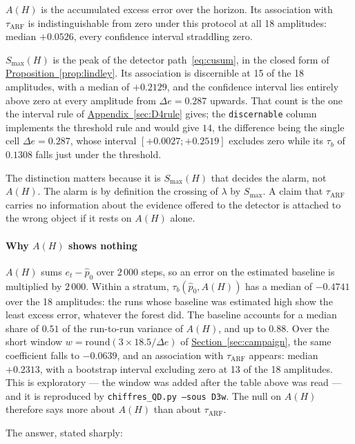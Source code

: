 \documentclass[10pt,conference]{IEEEtran}
\theoremstyle{definition}
\begin{document}
$A(H)$ is the accumulated excess error over the horizon. Its association with
$\tau_{\mathrm{ARF}}$ is indistinguishable from zero under this protocol at all
18 amplitudes: median $+0.0526$, every confidence interval straddling zero.

$S_{\max}(H)$ is the peak of the detector path~\eqref{eq:cusum}, in the closed form of
\hyperref[prop:lindley]{Proposition~\ref*{prop:lindley}}. Its association is discernible at 15 of the 18 amplitudes, with a median of $+0.2129$, and the
confidence interval lies entirely above zero at every amplitude from $\Delta e = 0.287$
upwards. That count is the one the interval rule of \hyperref[sec:D4rule]{Appendix~\ref*{sec:D4rule}} gives; the
\texttt{discernable} column implements the threshold rule and would give $14$, the
difference being the single cell $\Delta e = 0.287$, whose interval $[+0.0027 ; +0.2519]$
excludes zero while its $\tau_b$ of $0.1308$ falls just under the threshold.

The distinction matters because it is $S_{\max}(H)$ that decides the alarm, not $A(H)$.
The alarm is by definition the crossing of $\lambda$ by $S_{\max}$. A claim that
$\tau_{\mathrm{ARF}}$ carries no information about the evidence offered to the detector is
attached to the wrong object if it rests on $A(H)$ alone.

\paragraph{Why $A(H)$ shows nothing} $A(H)$ sums $e_t - \hat p_0$ over $2\,000$ steps, so an
error on the estimated baseline is multiplied by $2\,000$. Within a stratum,
$\tau_b(\hat p_0, A(H))$ has a median of $-0.4741$ over the 18 amplitudes: the runs whose
baseline was estimated high show the least excess error, whatever the forest did. The
baseline accounts for a median share of $0.51$ of the run-to-run variance of $A(H)$, and up
to $0.88$. Over the short window $w = \mathrm{round}(3 \times 18.5/\Delta e)$ of
\hyperref[sec:campaign]{Section~\ref*{sec:campaign}}, the same coefficient falls to $-0.0639$, and an association
with $\tau_{\mathrm{ARF}}$ appears: median $+0.2313$, with a bootstrap interval excluding
zero at 13 of the 18 amplitudes. This is exploratory --- the window was added after the
table above was read --- and it is reproduced by \texttt{chiffres\_QD.py --sous D3w}. The
null on $A(H)$ therefore says more about $A(H)$ than about $\tau_{\mathrm{ARF}}$.

\noindent The answer, stated sharply:
\end{document}

